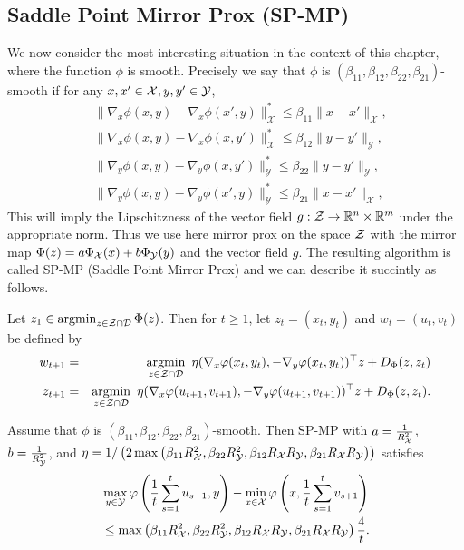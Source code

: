 \subsection{Saddle Point Mirror Prox (SP-MP)}
We now consider the most interesting situation in the context of this chapter, where the function $\phi$ is smooth. Precisely we say that $\phi$ is $(\beta_{11}, \beta_{12}, \beta_{22}, \beta_{21})$-smooth if for any $x, x' \in \mathcal{X}, y, y' \in \mathcal{Y}$, 
\begin{align*}
& \|\nabla_x \phi(x,y) - \nabla_x \phi(x',y) \|_{\mathcal{X}}^* \leq \beta_{11} \|x-x'\|_{\mathcal{X}} , \\
& \|\nabla_x \phi(x,y) - \nabla_x \phi(x,y') \|_{\mathcal{X}}^* \leq \beta_{12} \|y-y'\|_{\mathcal{Y}} , \\
& \|\nabla_y \phi(x,y) - \nabla_y \phi(x,y') \|_{\mathcal{Y}}^* \leq \beta_{22} \|y-y'\|_{\mathcal{Y}} , \\
& \|\nabla_y \phi(x,y) - \nabla_y \phi(x',y) \|_{\mathcal{Y}}^* \leq \beta_{21} \|x-x'\|_{\mathcal{X}} ,
\end{align*}
This will imply the Lipschitzness of the vector field $g : \mathcal{Z} \rightarrow \mathbb{R}^n \times \mathbb{R}^m$ under the appropriate norm. Thus we use here mirror prox on the space $\mathcal{Z}$ with the mirror map $\Phi(z) = a \Phi_{\mathcal{X}}(x) + b \Phi_{\mathcal{Y}}(y)$ and the vector field $g$. The resulting algorithm is called SP-MP (Saddle Point Mirror Prox) and we can describe it succintly as follows.

Let $z_1 \in \mathop{\mathrm{argmin}}_{z \in \mathcal{Z} \cap \mathcal{D}} \Phi(z)$. Then for $t \geq 1$, let $z_t=(x_t,y_t)$ and $w_t=(u_t, v_t)$ be defined by
\begin{eqnarray*}
w_{t+1} & = & \mathop{\mathrm{argmin}}_{z \in \mathcal{Z} \cap \mathcal{D}} \ \eta (\nabla_x \varphi(x_t, y_t), - \nabla_y \varphi(x_t,y_t))^{\top} z + D_{\Phi}(z,z_t) \\
z_{t+1} & = & \mathop{\mathrm{argmin}}_{z \in \mathcal{Z} \cap \mathcal{D}} \ \eta (\nabla_x \varphi(u_{t+1}, v_{t+1}), - \nabla_y \varphi(u_{t+1},v_{t+1}))^{\top} z + D_{\Phi}(z,z_t) .
\end{eqnarray*}

\begin{theorem} \label{th:spmp}
Assume that $\phi$ is $(\beta_{11}, \beta_{12}, \beta_{22}, \beta_{21})$-smooth. Then SP-MP with $a= \frac{1}{R_{\mathcal{X}}^2}$, $b=\frac{1}{R_{\mathcal{Y}}^2}$, and 
$\eta= 1 / \left(2 \max \left(\beta_{11} R^2_{\mathcal{X}}, \beta_{22} R^2_{\mathcal{Y}}, \beta_{12} R_{\mathcal{X}} R_{\mathcal{Y}}, \beta_{21} R_{\mathcal{X}} R_{\mathcal{Y}}\right) \right)$
satisfies
\begin{align*}
& \max_{y \in \mathcal{Y}} \varphi\left( \frac1{t} \sum_{s=1}^t u_{s+1},y \right) - \min_{x \in \mathcal{X}} \varphi\left(x, \frac1{t} \sum_{s=1}^t v_{s+1} \right) \\
& \leq \max \left(\beta_{11} R^2_{\mathcal{X}}, \beta_{22} R^2_{\mathcal{Y}}, \beta_{12} R_{\mathcal{X}} R_{\mathcal{Y}}, \beta_{21} R_{\mathcal{X}} R_{\mathcal{Y}}\right) \frac{4}{t} .
\end{align*}
\end{theorem}

